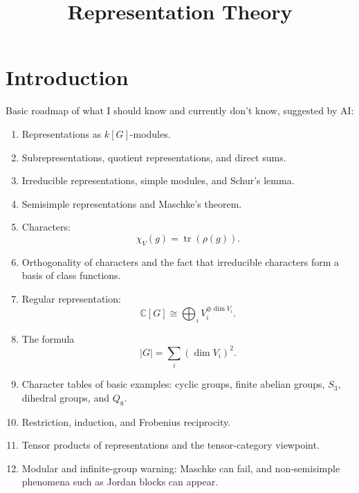 



\title{Representation Theory}
\maketitle

\label{section-phantom}

\tableofcontents

\section{Introduction}
\label{section-introduction}

\noindent
Basic roadmap 
of what I should know
and currently don't know,
suggested by AI:

\begin{enumerate}
\item Representations as $k[G]$-modules.

\item Subrepresentations, quotient
representations, and direct sums.

\item Irreducible representations, simple
modules, and Schur's lemma.

\item Semisimple representations and
Maschke's theorem.

\item Characters:
$$
\chi_V(g)=\operatorname{tr}(\rho(g)).
$$

\item Orthogonality of characters and the
fact that irreducible characters form a
basis of class functions.

\item Regular representation:
$$
\mathbb{C}[G]
\cong
\bigoplus_i V_i^{\oplus \dim V_i}.
$$

\item The formula
$$
|G|=\sum_i(\dim V_i)^2.
$$

\item Character tables of basic examples:
cyclic groups, finite abelian groups,
$S_3$, dihedral groups, and $Q_8$.

\item Restriction, induction, and Frobenius
reciprocity.

\item Tensor products of representations and
the tensor-category viewpoint.

\item Modular and infinite-group warning:
Maschke can fail, and non-semisimple
phenomena such as Jordan blocks can appear.
\end{enumerate}

